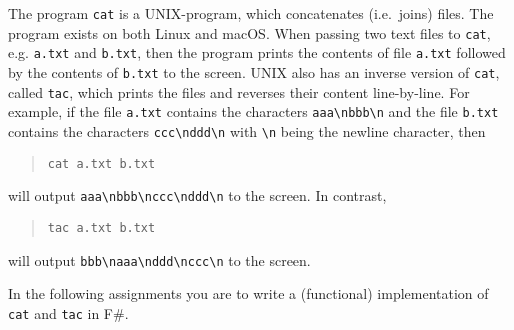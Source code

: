 The program \lstinline[language=console]{cat} is a UNIX-program, which concatenates (i.e.\ joins) files. The program exists on both Linux and macOS. When passing two text files to \lstinline[language=console]{cat}, e.g. \lstinline[language=console]{a.txt} and \lstinline[language=console]{b.txt}, then the program prints the contents of file \lstinline[language=console]{a.txt} followed by the contents of \lstinline[language=console]{b.txt} to the screen. UNIX also has an inverse version of \texttt{cat}, called \texttt{tac}, which prints the files and reverses their content line-by-line. For example, if the file \lstinline[language=console]{a.txt} contains the characters \lstinline[language=console]{aaa\nbbb\n} and the file \lstinline[language=console]{b.txt} contains the characters \lstinline[language=console]{ccc\nddd\n} with \lstinline[language=console]{\n} being the newline character, then
\begin{quote}
\lstinline[language=console]{cat a.txt b.txt}
\end{quote}
will output \lstinline[language=console]{aaa\nbbb\nccc\nddd\n} to the screen. In contrast,
\begin{quote}
\lstinline[language=console]{tac a.txt b.txt}
\end{quote}
will output \lstinline[language=console]{bbb\naaa\nddd\nccc\n} to the screen.

In the following assignments you are to write a (functional) implementation of \lstinline[language=console]{cat} and \lstinline[language=console]{tac} in F\#.
